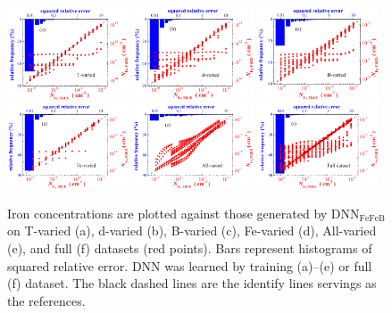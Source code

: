 \documentclass[a4paper,fleqn]{cas-sc}
\begin{document}
\begin{figure}[tb]
\centering
\includegraphics[width=0.32\textwidth]{F3a}
\includegraphics[width=0.32\textwidth]{F3b}
\includegraphics[width=0.32\textwidth]{F3c}
\includegraphics[width=0.32\textwidth]{F3d}
\includegraphics[width=0.32\textwidth]{F3e}
\includegraphics[width=0.32\textwidth]{F3f}
\caption{Iron concentrations are plotted against those generated by DNN$_\mathrm{FeFeB}$
on  T-varied (a),
d-varied (b),
B-varied (c),
Fe-varied (d),
All-varied (e),
and full (f) datasets (red points).
Bars represent histograms of squared relative error.
DNN was learned by training (a)--(e) or full (f) dataset.
The black dashed lines are the identify lines servings as the references.}
\label{fig_TrDNN1}
\end{figure}
\end{document}
